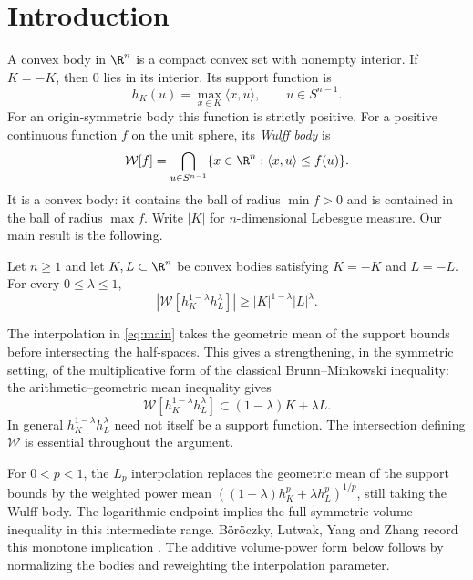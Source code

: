 \begin{abstract}
We prove the logarithmic Brunn--Minkowski conjecture for arbitrary
origin-symmetric convex bodies in every dimension. The theorem also gives
the symmetric $L_p$ Brunn--Minkowski inequality for every $0<p<1$.
Combined with Saroglou's transfer theorem and a support-subspace reduction,
it yields the logarithmic inequality for every even log-concave Radon
measure and the scalar-dilation $(B)$-conjecture.
\end{abstract}
\section{Introduction}
\label{sec:introduction}

A convex body in $\R^n$ is a compact convex set with nonempty interior.
If $K=-K$, then $0$ lies in its interior.
Its support function is
\[
 h_K(u)=\max_{x\in K}\langle x,u\rangle,\qquad u\in S^{n-1}.
\]
For an origin-symmetric body this function is strictly positive.
For a positive continuous function $f$ on the unit sphere, its
\emph{Wulff body} is
\[
 \mathcal W[f]=\bigcap_{u\in S^{n-1}}
 \{x\in\R^n:\langle x,u\rangle\le f(u)\}.
\]
It is a convex body: it contains the ball of radius $\min f>0$ and
is contained in the ball of radius $\max f$. Write $|K|$ for
$n$-dimensional Lebesgue measure. Our main result is the following.

\begin{theorem}
\label{thm:main}
Let $n\ge1$ and let $K,L\subset\R^n$ be convex bodies satisfying
$K=-K$ and $L=-L$. For every $0\le\lambda\le1$,
\begin{equation}\label{eq:main}
 \left|\mathcal W[h_K^{1-\lambda}h_L^\lambda]\right|
 \ge |K|^{1-\lambda}|L|^\lambda.
\end{equation}
\end{theorem}

The interpolation in \eqref{eq:main} takes the geometric mean of the
support bounds before intersecting the half-spaces. This gives a
strengthening, in the symmetric setting, of the multiplicative form
of the classical Brunn--Minkowski inequality: the arithmetic--geometric
mean inequality gives
\[
 \mathcal W[h_K^{1-\lambda}h_L^\lambda]
 \subset (1-\lambda)K+\lambda L.
\]
In general $h_K^{1-\lambda}h_L^\lambda$ need not itself be a support
function. The intersection defining $\mathcal W$ is essential throughout
the argument.

For $0<p<1$, the $L_p$ interpolation replaces the geometric mean of the
support bounds by the weighted power mean
$((1-\lambda)h_K^p+\lambda h_L^p)^{1/p}$, still taking the Wulff body.
The logarithmic endpoint implies the full symmetric volume inequality in
this intermediate range. B\"or\"oczky, Lutwak, Yang and Zhang record
this monotone implication
\cite[equation~(1.10) and the following paragraph, p.~1977]{BLZY2012}.
The additive
volume-power form below follows by normalizing the bodies and reweighting
the interpolation parameter.

